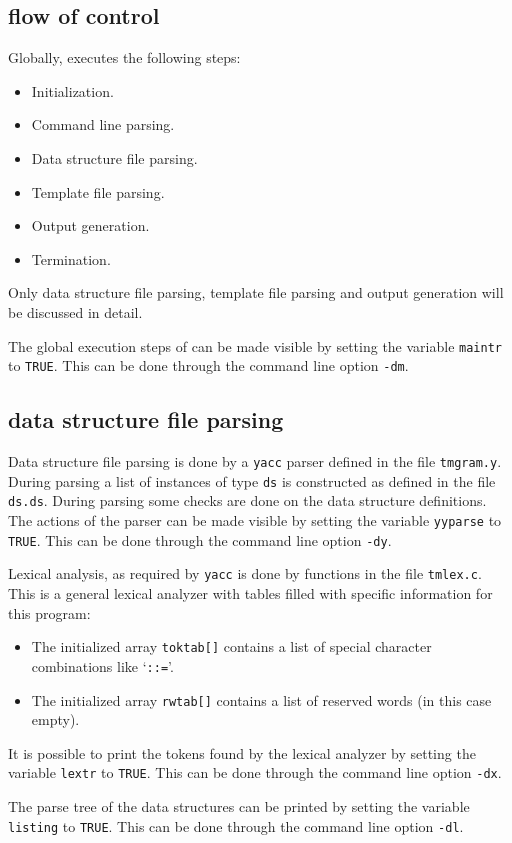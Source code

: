 \subsection{flow of control}
Globally, {\Tm} executes the following steps:
\begin{itemize}
\item Initialization.
\item Command line parsing.
\item Data structure file parsing.
\item Template file parsing.
\item Output generation.
\item Termination.
\end{itemize}
Only data structure file parsing, template file parsing and output
generation will be discussed in detail.
\par
The global execution steps of {\Tm} can be made visible by setting
the variable \texttt{maintr} to \texttt{TRUE}.
This can be done through the command line option \texttt{-dm}.
\subsection{data structure file parsing}
Data structure file parsing is done by a \texttt{yacc} parser defined in
the file \texttt{tmgram.y}.
During parsing a list of instances of type \texttt{ds} is constructed as
defined in the file \texttt{ds.ds}.
During parsing some checks are done on the data structure definitions.
The actions of the parser can be made visible by
setting the variable \texttt{yyparse} to \texttt{TRUE}.
This can be done through the command line option \texttt{-dy}.
\par
Lexical analysis, as required by \texttt{yacc} is done by functions in the file
\texttt{tmlex.c}.
This is a general lexical analyzer with tables filled with specific
information for this program:
\begin{itemize}
\item The initialized array \texttt{toktab[]} contains a list of special
character combinations like `\verb!::=!'.
\item The initialized array \texttt{rwtab[]} contains a list of reserved words
      (in this case empty).
\end{itemize}
It is possible to print the tokens found by
the lexical analyzer by setting the variable \texttt{lextr} to \texttt{TRUE}.
This can be done through the command line option \texttt{-dx}.
\par
The parse tree of the data structures can be printed by setting the
variable \texttt{listing} to \texttt{TRUE}.
This can be done through the command line option \texttt{-dl}.
